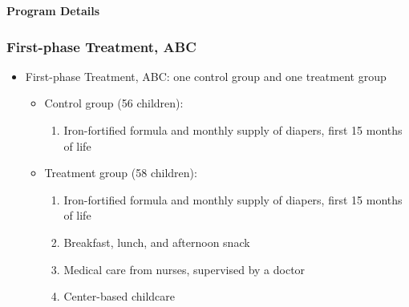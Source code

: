 \documentclass[static]{JJH-Beamer}
\begin{document}
\begin{frame}
 \addtocounter{framenumber}{-1}

\hypertarget{scrambledeggs}{}
\begin{center}
\textbf{Program Details}
\end{center}

\end{frame}

\begin{frame}
 \addtocounter{framenumber}{-1}\label{secondphase}
\frametitle{First-phase Treatment, ABC}

\begin{itemize}
\item First-phase Treatment, ABC: one control group and one treatment group
	\begin{itemize}
	\item Control group (56 children):
		\begin{enumerate}								
		\item Iron-fortified formula and monthly supply of diapers, first 15 months of life
		\end{enumerate}
	\item Treatment group (58 children):
		\begin{enumerate}
		\item Iron-fortified formula and monthly supply of diapers, first 15 months of life
		\item Breakfast, lunch, and afternoon snack
		\item Medical care from nurses, supervised by a doctor
		\item Center-based childcare
		\end{enumerate}
	\end{itemize}			
\end{itemize}

\end{frame}
\end{document}
